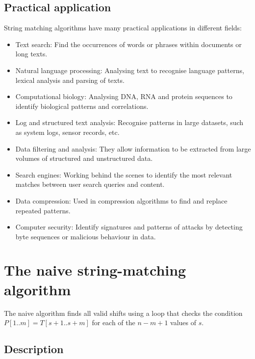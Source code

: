 \documentclass[11pt]{article}
\begin{document}
        \subsection{Practical application} \label{subsec:practical_application}

            String matching algorithms have many practical applications in different fields:
            \begin{itemize}
                \item Text search: Find the occurrences of words or phrases within documents or long texts.
                \item Natural language processing: Analysing text to recognise language patterns, lexical analysis and parsing of texts.
                \item Computational biology: Analysing DNA, RNA and protein sequences to identify biological patterns and correlations.
                \item Log and structured text analysis: Recognise patterns in large datasets, such as system logs, sensor records, etc.
                \item Data filtering and analysis: They allow information to be extracted from large volumes of structured and unstructured data.
                \item Search engines: Working behind the scenes to identify the most relevant matches between user search queries and content.
                \item Data compression: Used in compression algorithms to find and replace repeated patterns.
                \item Computer security: Identify signatures and patterns of attacks by detecting byte sequences or malicious behaviour in data.
            \end{itemize}

    \section{The naive string-matching algorithm} \label{sec:naive_string_matching_algorithm}

        The naive algorithm finds all valid shifts using a loop that checks the condition $P[1..m] = T[s+1..s+m]$ for each of the $n - m + 1$ values of $s$.

        \subsection{Description} \label{subsec:naive_description}
\end{document}
